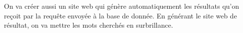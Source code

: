 
On va créer aussi un site web qui génère automatiquement les résultats qu'on reçoit par la requête envoyée à la base de donnée. En générant le site web de résultat, on va mettre les mots cherchés en surbrillance. 
